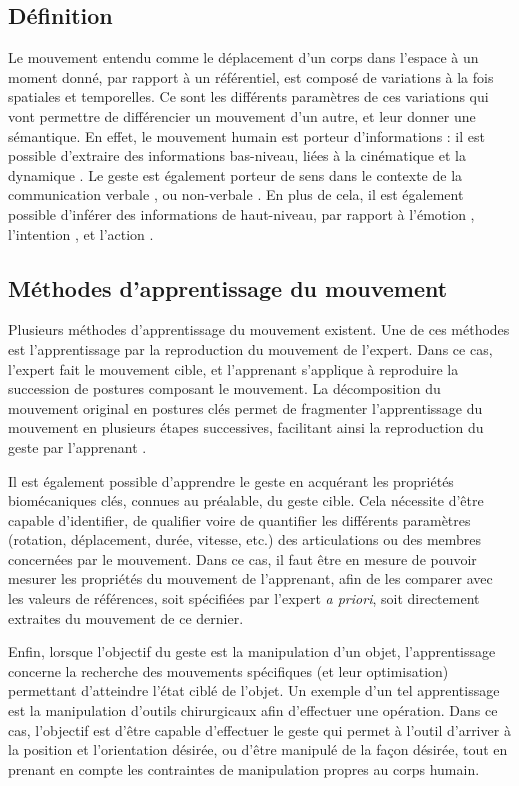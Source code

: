 \subsection{Définition}
Le mouvement entendu comme le déplacement d'un corps dans l'espace à un moment donné, par rapport à un référentiel, est composé de variations à la fois spatiales et temporelles. Ce sont les différents paramètres de ces variations qui vont permettre de différencier un mouvement d'un autre, et leur donner une sémantique. En effet, le mouvement humain est porteur d'informations : il est possible d'extraire des informations bas-niveau, liées à la cinématique et la dynamique \parencite{Nunes2016}. Le geste est également porteur de sens dans le contexte de la communication verbale \parencite{Huang2015}, ou non-verbale \parencite{Chang201379}. En plus de cela, il est également possible d'inférer des informations de haut-niveau, par rapport à l'émotion \parencite{Kobayashi2007}, l'intention \parencite{Yu2015}, et l'action \parencite{Kapsouras20141432}.

\subsection{Méthodes d'apprentissage du mouvement}
Plusieurs méthodes d'apprentissage du mouvement existent. Une de ces méthodes est l'apprentissage par la reproduction du mouvement de l'expert. Dans ce cas, l'expert fait le mouvement cible, et l'apprenant s'applique à reproduire la succession de postures composant le mouvement. La décomposition du mouvement original en postures clés permet de fragmenter l'apprentissage du mouvement en plusieurs étapes successives, facilitant ainsi la reproduction du geste par l'apprenant \parencite{Maes2012DtM}.

Il est également possible d'apprendre le geste en acquérant les propriétés biomécaniques clés, connues au préalable, du geste cible. Cela nécessite d'être capable d'identifier, de qualifier voire de quantifier les différents paramètres (rotation, déplacement, durée, vitesse, etc.) des articulations ou des membres concernées par le mouvement. Dans ce cas, il faut être en mesure de pouvoir mesurer les propriétés du mouvement de l'apprenant, afin de les comparer avec les valeurs de références, soit spécifiées par l'expert \textit{a priori}, soit directement extraites du mouvement de ce dernier.

Enfin, lorsque l'objectif du geste est la manipulation d'un objet, l'apprentissage concerne la recherche des mouvements spécifiques (et leur optimisation) permettant d'atteindre l'état ciblé de l'objet. Un exemple d'un tel apprentissage est la manipulation d'outils chirurgicaux afin d'effectuer une opération. Dans ce cas, l'objectif est d'être capable d'effectuer le geste qui permet à l'outil d'arriver à la position et l'orientation désirée, ou d'être manipulé de la façon désirée, tout en prenant en compte les contraintes de manipulation propres au corps humain.

